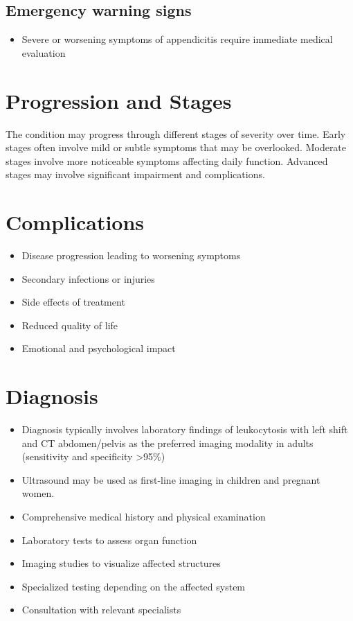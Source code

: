 \subsection{Emergency warning signs}
\begin{itemize}[noitemsep]
  \item Severe or worsening symptoms of appendicitis require immediate medical evaluation
\end{itemize}
\section{Progression and Stages}
The condition may progress through different stages of severity over time. Early stages often involve mild or subtle symptoms that may be overlooked. Moderate stages involve more noticeable symptoms affecting daily function. Advanced stages may involve significant impairment and complications.
\section{Complications}
\begin{itemize}[noitemsep]
  \item Disease progression leading to worsening symptoms
  \item Secondary infections or injuries
  \item Side effects of treatment
  \item Reduced quality of life
  \item Emotional and psychological impact
\end{itemize}
\section{Diagnosis}
\begin{itemize}[noitemsep]
  \item Diagnosis typically involves laboratory findings of leukocytosis with left shift and CT abdomen/pelvis as the preferred imaging modality in adults (sensitivity and specificity >95\%)
  \item Ultrasound may be used as first-line imaging in children and pregnant women.
  \item Comprehensive medical history and physical examination
  \item Laboratory tests to assess organ function
  \item Imaging studies to visualize affected structures
  \item Specialized testing depending on the affected system
  \item Consultation with relevant specialists
\end{itemize}
